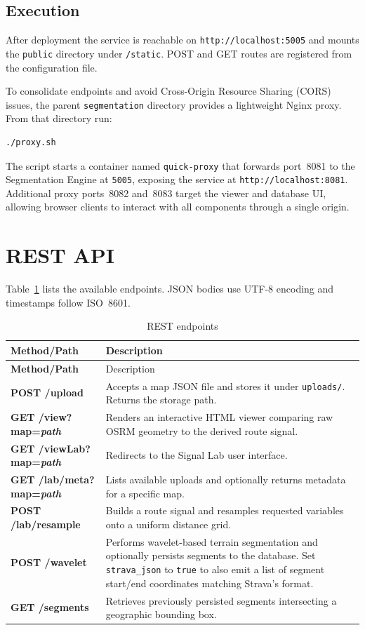 \documentclass{article}
\begin{document}
\subsection{Execution}
After deployment the service is reachable on \texttt{http://localhost:5005} and mounts the \texttt{public} directory under \texttt{/static}. POST and GET routes are registered from the configuration file.

To consolidate endpoints and avoid Cross-Origin Resource Sharing (CORS) issues, the parent
\texttt{segmentation} directory provides a lightweight Nginx proxy. From that directory run:
\begin{verbatim}
./proxy.sh
\end{verbatim}
The script starts a container named \texttt{quick-proxy} that forwards port~8081 to the
Segmentation Engine at \texttt{5005}, exposing the service at \texttt{http://localhost:8081}.
Additional proxy ports~8082 and~8083 target the viewer and database UI, allowing browser
clients to interact with all components through a single origin.

\section{REST API}
Table~\ref{tab:api} lists the available endpoints. JSON bodies use UTF-8 encoding and timestamps follow ISO~8601.
\begin{longtable}{>{\bfseries}p{3cm}p{9cm}}
\caption{REST endpoints}\label{tab:api}\\
Method/Path & Description \\\hline
\endfirsthead
Method/Path & Description \\\hline
\endhead
POST /upload & Accepts a map JSON file and stores it under \texttt{uploads/}. Returns the storage path.\\
GET /view?map=\emph{path} & Renders an interactive HTML viewer comparing raw OSRM geometry to the derived route signal.\\
GET /viewLab?map=\emph{path} & Redirects to the Signal Lab user interface.\\
GET /lab/meta?map=\emph{path} & Lists available uploads and optionally returns metadata for a specific map.\\
POST /lab/resample & Builds a route signal and resamples requested variables onto a uniform distance grid.\\
POST /wavelet & Performs wavelet-based terrain segmentation and optionally persists segments to the database. Set \texttt{strava\_json} to \texttt{true} to also emit a list of segment start/end coordinates matching Strava's format.\\
GET /segments & Retrieves previously persisted segments intersecting a geographic bounding box.\\
\end{longtable}
\end{document}
